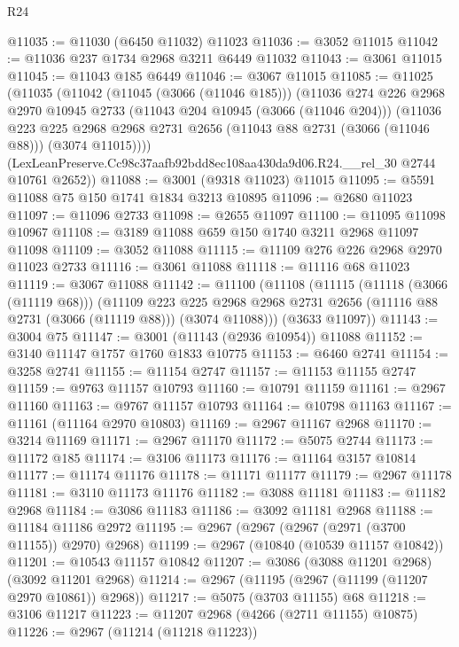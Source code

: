 \begin{lexlean}{R24}
\begin{coremodule}
@11035 := @11030 (@6450 @11032) @11023
@11036 := @3052 @11015
@11042 := @11036 @237 @1734 @2968 @3211 @6449 @11032
@11043 := @3061 @11015
@11045 := @11043 @185 @6449
@11046 := @3067 @11015
@11085 := @11025
    (@11035
      (@11042
        (@11045 (@3066 (@11046 @185)))
        (@11036
          @274
          @226
          @2968
          @2970
          @10945
          @2733
          (@11043 @204 @10945 (@3066 (@11046 @204)))
          (@11036
            @223
            @225
            @2968
            @2968
            @2731
            @2656
            (@11043 @88 @2731 (@3066 (@11046 @88)))
            (@3074 @11015))))
      (LexLeanPreserve.Cc98c37aafb92bdd8ec108aa430da9d06.R24.__rel_30 @2744 @10761 @2652))
@11088 := @3001 (@9318 @11023) @11015
@11095 := @5591 @11088 @75 @150 @1741 @1834 @3213 @10895
@11096 := @2680 @11023
@11097 := @11096 @2733
@11098 := @2655 @11097
@11100 := @11095 @11098 @10967
@11108 := @3189 @11088 @659 @150 @1740 @3211 @2968 @11097 @11098
@11109 := @3052 @11088
@11115 := @11109 @276 @226 @2968 @2970 @11023 @2733
@11116 := @3061 @11088
@11118 := @11116 @68 @11023
@11119 := @3067 @11088
@11142 := @11100
    (@11108
      (@11115
        (@11118 (@3066 (@11119 @68)))
        (@11109
          @223
          @225
          @2968
          @2968
          @2731
          @2656
          (@11116 @88 @2731 (@3066 (@11119 @88)))
          (@3074 @11088)))
      (@3633 @11097))
@11143 := @3004 @75
@11147 := @3001 (@11143 (@2936 @10954)) @11088
@11152 := @3140 @11147 @1757 @1760 @1833 @10775
@11153 := @6460 @2741
@11154 := @3258 @2741
@11155 := @11154 @2747
@11157 := @11153 @11155 @2747
@11159 := @9763 @11157 @10793
@11160 := @10791 @11159
@11161 := @2967 @11160
@11163 := @9767 @11157 @10793
@11164 := @10798 @11163
@11167 := @11161 (@11164 @2970 @10803)
@11169 := @2967 @11167 @2968
@11170 := @3214 @11169
@11171 := @2967 @11170
@11172 := @5075 @2744
@11173 := @11172 @185
@11174 := @3106 @11173
@11176 := @11164 @3157 @10814
@11177 := @11174 @11176
@11178 := @11171 @11177
@11179 := @2967 @11178
@11181 := @3110 @11173 @11176
@11182 := @3088 @11181
@11183 := @11182 @2968
@11184 := @3086 @11183
@11186 := @3092 @11181 @2968
@11188 := @11184 @11186 @2972
@11195 := @2967 (@2967 (@2967 (@2971 (@3700 @11155)) @2970) @2968)
@11199 := @2967 (@10840 (@10539 @11157 @10842))
@11201 := @10543 @11157 @10842
@11207 := @3086 (@3088 @11201 @2968) (@3092 @11201 @2968)
@11214 := @2967 (@11195 (@2967 (@11199 (@11207 @2970 @10861)) @2968))
@11217 := @5075 (@3703 @11155) @68
@11218 := @3106 @11217
@11223 := @11207 @2968 (@4266 (@2711 @11155) @10875)
@11226 := @2967 (@11214 (@11218 @11223))

\end{coremodule}
\end{lexlean}
